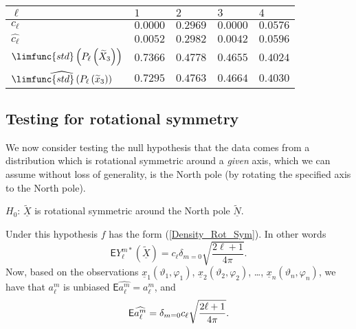 \documentclass[preprint,11pt,a4paper]{elsarticle}
\begin{document}
\begin{center}
\begin{tabular}{|l|l|l|l|l|}
\hline
$\ell$ & $1$ & $2$ & $3$ & $4$ \\ \hline
$c_{\ell}$ & $0.0000$ & $0.2969$ & $0.0000$ & $0.0576$ \\ \hline
$\widehat{c_{\ell}}$ & $0.0052$ & $0.2982$ & $0.0042$ & $0.0596$ \\ \hline
$\limfunc{std}\left( P_{\ell}\left( \widetilde{X}_{3}\right) \right) $ & $%
0.7366$ & $0.4778$ & $0.4655$ & $0.4024$ \\ \hline
$\widehat{\limfunc{std}\left( P_{\ell}\left( \widetilde{x}_{3}\right)
\right) }$ & $0.7295$ & $0.4763$ & $0.4664$ & $0.4030$ \\ \hline
\end{tabular}
\end{center}

\subsection{Testing for rotational symmetry}

We now consider testing the null hypothesis that the data comes from a
distribution which is rotational symmetric around a \textit{given} axis,
which we can assume without loss of generality, is the North pole (by
rotating the specified axis to the North pole).

\begin{center}
$H_{0}$: $\underline{\widetilde{X}}$ is rotational symmetric around the
North pole $\underline{\widetilde{N}}$.
\end{center}

Under this hypothesis $f$ has the form (\ref{Density_Rot_Sym}). In other
words 
\begin{equation*}
\mathsf{E}Y_{\ell}^{m\ast}\left( \underline{\widetilde{X}}\right) =c_{\ell
}\delta_{m=0}\sqrt{\frac{2\ell+1}{4\pi}}.
\end{equation*}
Now, based on the observations $\underline{x}_{1}\left(
\vartheta_{1},\varphi_{1}\right) $, $\underline{x}_{2}\left(
\vartheta_{2},\varphi _{2}\right) $, \ldots, $\underline{x}_{n}\left(
\vartheta_{n},\varphi _{n}\right) $, we have that $\widehat{a_{\ell}^{m}}$
is unbiased $\mathsf{E}\widehat{a_{\ell}^{m}}=a_{\ell}^{m}$, and 
\begin{equation*}
\mathsf{E}\widehat{a_{\ell}^{m}}=\delta_{m=0}c_{\ell}\sqrt{\frac{2\ell+1}{%
4\pi}}.
\end{equation*}
\end{document}
